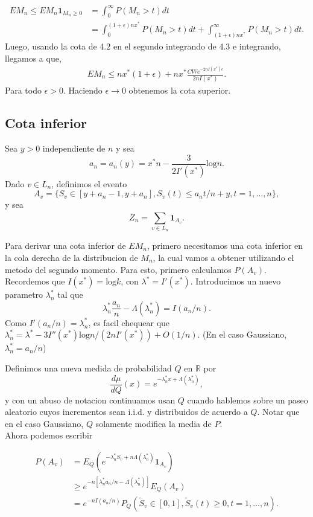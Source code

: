 \documentclass[12pt]{report}
\begin{document}
\begin{align}
EM_n \leq EM_n\mathbf{1}_{M_n \geq 0} &= \int_{0}^{\infty} P(M_n > t) dt \nonumber\\
&= \int_{0}^{(1+\epsilon)nx^*} P(M_n > t) dt + \int_{(1+\epsilon)nx^*}^{\infty} P(M_n > t) dt .\nonumber
\end{align}
Luego, usando la cota de 4.2 en el segundo integrando de 4.3 e integrando, llegamos a que,
\begin{align}
EM_n \leq nx^*(1+\epsilon) + nx^* \frac{CWe^{-2nI(x^*)\epsilon}}{2nI(x^*)}.
\end{align}
Para todo $\epsilon > 0$. Haciendo $\epsilon \to 0$ obtenemos la cota superior.

\subsection{Cota inferior}
Sea $y>0$ independiente de $n$ y sea
\[
a_n = a_n(y) = x^*n - \frac{3}{2I'(x^*)} \text{log} n.
\]
Dado $v \in L_n$, definimos el evento
\[
A_v = \{ S_v \in [y+a_n-1,y+a_n], S_v(t)\leq a_n t / n + y, t = 1, \dots, n \},
\]
y sea
\[
Z_n = \sum_{v \in L_n}^{} \mathbf{1}_{A_v}.
\]

Para derivar una cota inferior de $EM_n$, primero necesitamos una cota inferior en la
cola derecha de la distribucion de $M_n$, la cual vamos a obtener utilizando el metodo del segundo momento. 
Para esto, primero calculamos $P(A_v)$. Recordemos que $I(x^*) = \text{log} k$, con $\lambda^*=I'(x^*)$. 
Introducimos un nuevo parametro $\lambda_{n}^{*}$ tal que
\[
\lambda_{n}^{*}\frac{a_n}{n}-\varLambda(\lambda_{n}^{*}) = I(a_n/n).
\]
Como $I'(a_n/n) = \lambda_{n}^{*}$, es facil chequear que $\lambda_{n}^{*} = 
\lambda^* - 3I''(x^*) \text{log}n/(2nI'(x^*)) + O(1/n)$. (En el caso Gaussiano, $\lambda_{n}^{*} = a_n / n $)

Definimos una nueva medida de probabilidad $Q$ en $\mathbb{R}$ por
\[
\frac{d\mu}{dQ}(x) = e^{-\lambda_{n}^{*}x + \varLambda(\lambda_{n}^{*})},
\]
y con un abuso de notacion continuamos usan $Q$ cuando hablemos sobre un paseo aleatorio 
cuyos incrementos sean i.i.d. y distribuidos de acuerdo a $Q$. Notar que en el caso Gaussiano, 
$Q$ solamente modifica la media de $P$. \\

Ahora podemos escribir 

\begin{align}
P(A_v) &= E_Q (e^{-\lambda_n^* S_v + n \Lambda(\lambda_n^*)} \mathbf{1}_{A_v}) \nonumber \\
&\geq e^{-n [\lambda_n^* a_n/n - \Lambda(\lambda_n^*)]} E_Q(A_v) \\
&= e^{-n I(a_n/n)} P_Q ( \tilde{S}_v \in [0,1], \tilde{S}_v (t) \geq 0, t = 1, \dots, n ). \nonumber 
\end{align}
\end{document}
